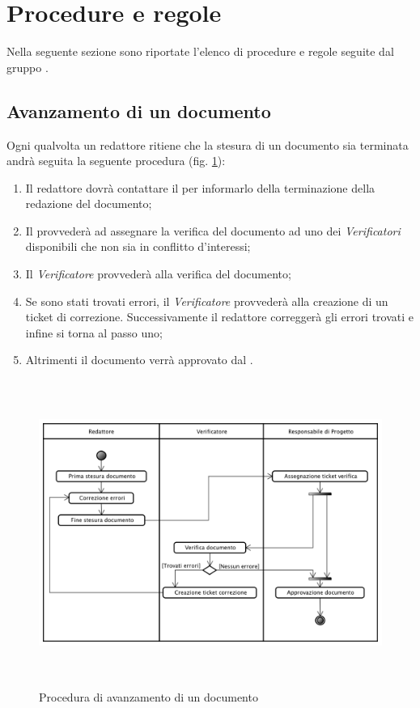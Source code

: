 \section{Procedure e regole}
\label{procedure}
Nella seguente sezione sono riportate l'elenco di procedure e regole seguite dal gruppo \authorName{}.


\subsection{Avanzamento di un documento}
\label{avanzamenteo_doc}
Ogni qualvolta un redattore ritiene che la stesura di un documento sia terminata andrà seguita la seguente procedura (fig. \ref{proc_avanzamento}):
\begin{enumerate}
\item Il redattore dovrà contattare il \projectManager{} per informarlo della terminazione della redazione del documento;
\item Il \projectManager{} provvederà ad assegnare la verifica del documento ad uno dei \emph{Verificatori} disponibili che non sia in conflitto d'interessi;
\item Il \emph{Verificatore} provvederà alla verifica del documento;
\item Se sono stati trovati errori, il \emph{Verificatore} provvederà alla creazione di un ticket di correzione.
Successivamente il redattore correggerà gli errori trovati e infine si torna al passo uno;
\item Altrimenti il documento verrà approvato dal \projectManager{}.
\end{enumerate}
\begin{figure}[!h]
\centering
	\includegraphics[height=10cm]{./content/Immagini/Avanzamento_Documento.png}
	\caption{Procedura di avanzamento di un documento}
	\label{proc_avanzamento}
\end{figure}

